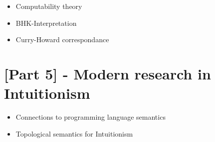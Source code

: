 \begin{itemize}
    \item Computability theory
    \item BHK-Interpretation
    \item Curry-Howard correspondance
\end{itemize}

\section{[Part 5] - Modern research in Intuitionism}
\begin{itemize}
    \item Connections to programming language semantics
    \item Topological semantics for Intuitionism
\end{itemize}


